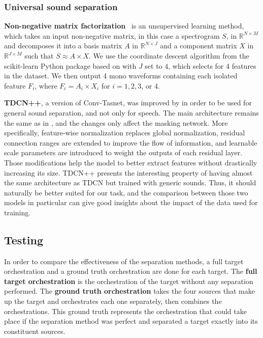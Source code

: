 \documentclass{article}
\begin{document}
      \subsubsection{Universal sound separation}
      \textbf{Non-negative matrix factorization}~\cite{Cichocki_NMF, Fevotte_NMF} is an unsupervised learning method, which takes an input non-negative matrix, in this case a spectrogram $S$, in $\mathbb{R} ^{N\times M}$ and decomposes it into a basis matrix $A$ in $\mathbb{R}^{N\times J}$ and a component matrix $X$ in $\mathbb{R}^{J\times M}$ such that $S\approx A\times X$. We use the coordinate descent algorithm from the scikit-learn Python package based on \cite{Cichocki_NMF} with $J$ set to $4$, which selects for 4 features in the dataset. We then output 4 mono waveforms containing each isolated feature $F_i$, where $F_i=A_i\times X_i$ for $i = 1, 2, 3$, or $4$.

      \textbf{TDCN++}, a version of Conv-Tasnet, was improved by \cite{tdcnpp} in order to be used for general sound separation, and not only for speech. The main architecture remains the same as in \cite{tdcn}, and the changes only affect the masking network. More specifically, feature-wise normalization replaces global normalization, residual connection ranges are extended to improve the flow of information, and learnable scale parameters are introduced to weight the outputs of each residual layer. Those modifications help the model to better extract features without drastically increasing its size.
      TDCN++ presents the interesting property of having almost the same architecture as TDCN but trained with generic sounds. Thus, it should naturally be better suited for our task, and the comparison between those two models in particular can give good insights about the impact of the data used for training.
  
    \subsection{Testing}\label{subsec:testing}
    In order to compare the effectiveness of the separation methods, a full target orchestration and a ground truth orchestration are done for each target. The \textbf{full target orchestration} is the orchestration of the target without any separation performed. The \textbf{ground truth orchestration} takes the four sources that make up the target and orchestrates each one separately, then combines the orchestrations. This ground truth represents the orchestration that could take place if the separation method was perfect and separated a target exactly into its constituent sources. 
    
\end{document}
